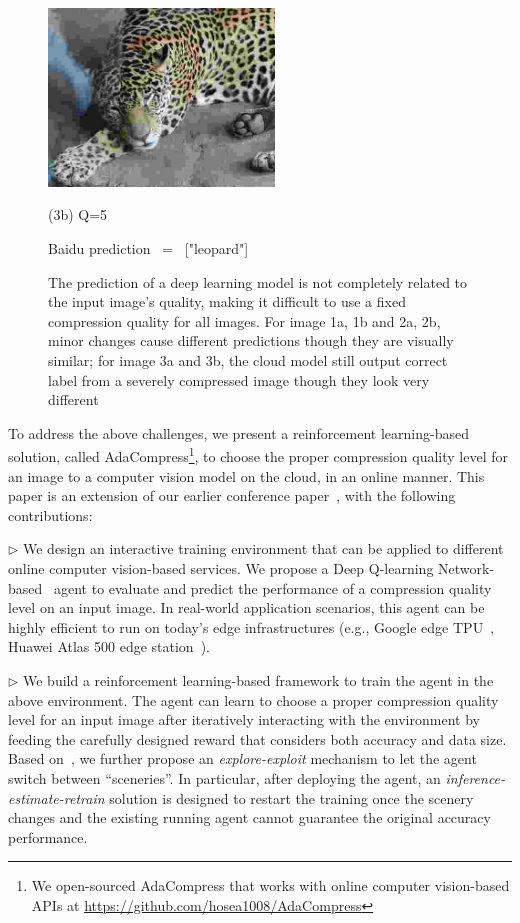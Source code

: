 \begin{figure}[htbp]
\begin{minipage}{0.5\linewidth}
		\centerline{\includegraphics[width=6.0cm, trim=0 0 0 0, clip]{figures/tiger_lowq.jpeg}}
		\centerline{(3b) Q=5}
		\centerline{Baidu prediction \ = \ ["leopard"]}
		\vspace{0.3cm}
	\end{minipage}
	\caption{The prediction of a deep learning model is not completely related to the input image's quality, making it difficult to use a fixed compression quality for all images. For image 1a, 1b and 2a, 2b, minor changes cause different predictions though they are visually similar; for image 3a and 3b, the cloud model still output correct label from a severely compressed image though they look very different}
	\label{fig: compress_accuracy}
\end{figure}

To address the above challenges, we present a reinforcement learning-based solution, called AdaCompress\footnote{We open-sourced AdaCompress that works with online computer vision-based APIs at \url{https://github.com/hosea1008/AdaCompress}}, to choose the proper compression quality level for an image to a computer vision model on the cloud, in an online manner. This paper is an extension of our earlier conference paper~\cite{2019adacompress}, with the following contributions:

$\rhd$ We design an interactive training environment that can be applied to different online computer vision-based services. We propose a Deep Q-learning Network-based~\cite{DQN} agent to evaluate and predict the performance of a compression quality level on an input image. In real-world application scenarios, this agent can be highly efficient to run on today's edge infrastructures (e.g., Google edge TPU~\cite{google-tpu}, Huawei Atlas 500 edge station~\cite{huawei-atlas500}).
	
$\rhd$ We build a reinforcement learning-based framework to train the agent in the above environment. The agent can learn to choose a proper compression quality level for an input image after iteratively interacting with the environment by feeding the carefully designed reward that considers both accuracy and data size. Based on~\cite{2019adacompress}, we further propose an \emph{explore-exploit} mechanism to let the agent switch between ``sceneries''. In particular, after deploying the agent, an \emph{inference-estimate-retrain} solution is designed to restart the training once the scenery changes and the existing running agent cannot guarantee the original accuracy performance.
	
